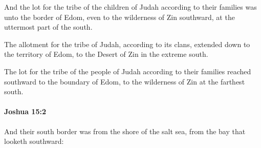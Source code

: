 			\begin{versebox}
					\item[BHS] 
					\item[ASV] And the lot for the tribe of the children of Judah according to their families was unto the border of Edom, even to the wilderness of Zin southward, at the uttermost part of the south.
					\item[NIV] The allotment for the tribe of Judah, according to its clans, extended down to the territory of Edom, to the Desert of Zin in the extreme south.
					\item[NRSV] The lot for the tribe of the people of Judah according to their families reached southward to the boundary of Edom, to the wilderness of Zin at the farthest south.
			\end{versebox}

		\paragraph{Joshua 15:2} %
			\label{JOSHUA-15-2}

			And their south border was from the shore of the salt sea, from the bay that looketh southward:

